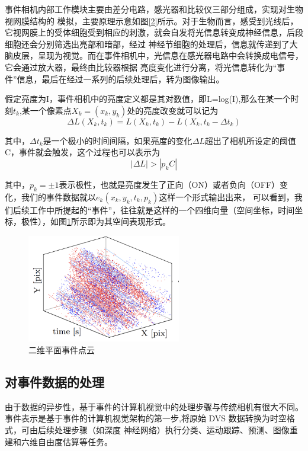 事件相机内部工作模块主要由差分电路，感光器和比较仪三部分组成，实现对生物视网膜结构的
模拟，主要原理示意如图\ref{2}所示。对于生物而言，感受到光线后，它视网膜上的受体细胞受到相应的刺激，就会自发将光信息转变成神经信息，后段细胞还会分别筛选出亮部和暗部，经过
神经节细胞的处理后，信息就传递到了大脑皮层，呈现为视觉。而在事件相机中，光信息在感光器电路中会转换成电信号，它会通过放大器，最终由比较器根据
亮度变化进行分离，将光信息转化为“事件”信息，最后在经过一系列的后续处理后，转为图像输出。\cite{eibensteiner2017event}

假定亮度为I，事件相机中的亮度定义都是其对数值，即L=log(I),那么在某一个时刻$t_k$,某一个像素点$X_k=(x_k,y_k)$处的亮度改变就可以记为
\begin{equation} 
    \Delta L(X_k,t_k)=L(X_k,t_k)-L(X_k,t_k-\Delta t_k)
\end{equation}

其中，$\Delta t_k$是一个极小的时间间隔，如果亮度的变化$\Delta L$超出了相机所设定的阈值C，事件就会触发，这个过程也可以表示为
\begin{equation} 
    |\Delta L|>|p_kC|
\end{equation}

其中，$p_k=\pm1$表示极性，也就是亮度发生了正向（ON）或者负向（OFF）变化，我们的事件数据就以$e_k(x_k,y_k,t_k,p_k)$这样一个形式输出出来，
可以看到，我们后续工作中所提起的“事件”，往往就是这样的一个四维向量（空间坐标，时间坐标，极性），如图\ref{4}所示即为其空间表现形式。
\begin{figure}
    \centering
    \includegraphics[width=0.6\textwidth]{figures/event_stream.png}
    \caption{二维平面事件点云}
    \label{4}
\end{figure}

\subsection{对事件数据的处理}
由于数据的异步性，基于事件的计算机视觉中的处理步骤与传统相机有很大不同。
事件表示是基于事件的计算机视觉架构的第一步,将原始 DVS 数据转换为时空格式，可由后续处理步骤（如深度
神经网络）执行分类、运动跟踪、预测、图像重建和六维自由度估算等任务。

